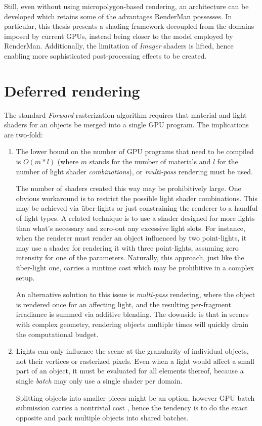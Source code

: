 Still, even without using micropolygon-based rendering, an architecture can be developed which retains some of the advantages RenderMan possesses. In particular, this thesis presents a shading framework decoupled from the domains imposed by current GPUs, instead being closer to the model employed by RenderMan. Additionally, the limitation of \emph{Imager} shaders is lifted, hence enabling more sophisticated post-processing effects to be created.


\section{Deferred rendering}

The standard \emph{Forward} rasterization algorithm requires that material and light shaders for an objects be merged into a single GPU program. The implications are two-fold:
\begin{enumerate}
\item The lower bound on the number of GPU programs that need to be compiled is $O(m * l)$ (where $m$ stands for the number of materials and $l$ for the number of light shader \emph{combinations}), or \emph{multi-pass} rendering must be used.

The number of shaders created this way may be prohibitively large. One obvious workaround is to restrict the possible light shader combinations. This may be achieved via über-lights \cite{UberLights, UberLightsCg} or just constraining the renderer to a handful of light types. A related technique is to use a shader designed for more lights than what's necessary and zero-out any excessive light slots. For instance, when the renderer must render an object influenced by two point-lights, it may use a shader for rendering it with three point-lights, assuming zero intensity for one of the parameters. Naturally, this approach, just like the über-light one, carries a runtime cost which may be prohibitive in a complex setup.

An alternative solution to this issue is \emph{multi-pass} rendering, where the object is rendered once for an affecting light, and the resulting per-fragment irradiance is summed via additive blending. The downside is that in scenes with complex geometry, rendering objects multiple times will quickly drain the computational budget.

\item Lights can only influence the scene at the granularity of individual objects, not their vertices or rasterized pixels. Even when a light would affect a small part of an object, it must be evaluated for all elements thereof, because a single \emph{batch} may only use a single shader per domain.

Splitting objects into smaller pieces might be an option, however GPU batch submission carries a nontrivial cost \cite{BatchBatchBatch}, hence the tendency is to do the exact opposite and pack multiple objects into shared batches.
\end{enumerate}

